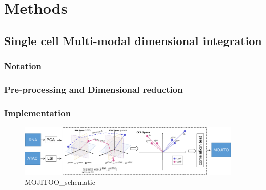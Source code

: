 
\chapter{Methods}
\label{chapter:methods}

\graphicspath{{chapter3/figs}}

\section{Single cell Multi-modal dimensional integration}
\subsection{Notation}

\subsection{Pre-processing and Dimensional reduction}

\subsection{Implementation}

\begin{figure}[!ht]
	\centering
	\includegraphics[width=0.95\textwidth]{MOJITOO_schematic/fig}
	\vspace{0.1cm}
	\caption[MOJITOO\_schematic.]{MOJITOO\_schematic}
	\label{fig:MOJITOO_schematic}
\end{figure}

